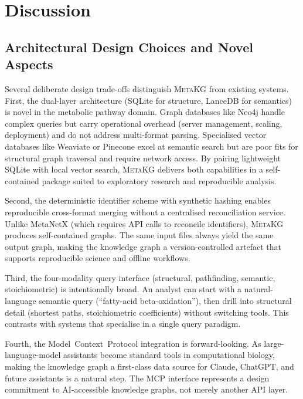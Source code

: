 \documentclass[10pt]{article}
\begin{document}
\section{Discussion}
\label{sec:discussion}

\subsection{Architectural Design Choices and Novel Aspects}

Several deliberate design trade-offs distinguish \textsc{MetaKG} from existing
systems. First, the dual-layer architecture (SQLite for structure, LanceDB for
semantics) is novel in the metabolic pathway domain. Graph databases like
Neo4j handle complex queries but carry operational overhead (server
management, scaling, deployment) and do not address multi-format parsing.
Specialised vector databases like Weaviate or Pinecone excel at semantic
search but are poor fits for structural graph traversal and require network
access. By pairing lightweight SQLite with local vector search,
\textsc{MetaKG} delivers both capabilities in a self-contained package suited
to exploratory research and reproducible analysis.

Second, the deterministic identifier scheme with synthetic hashing enables
reproducible cross-format merging without a centralised reconciliation
service. Unlike MetaNetX (which requires API calls to reconcile identifiers),
\textsc{MetaKG} produces self-contained graphs. The same input files always
yield the same output graph, making the knowledge graph a version-controlled
artefact that supports reproducible science and offline workflows.

Third, the four-modality query interface (structural, pathfinding, semantic,
stoichiometric) is intentionally broad. An analyst can start with a
natural-language semantic query (``fatty-acid beta-oxidation''), then drill
into structural detail (shortest paths, stoichiometric coefficients) without
switching tools. This contrasts with systems that specialise in a single query
paradigm.

Fourth, the Model~Context~Protocol integration is forward-looking. As
large-language-model assistants become standard tools in computational biology,
making the knowledge graph a first-class data source for Claude, ChatGPT, and
future assistants is a natural step. The MCP interface represents a design
commitment to AI-accessible knowledge graphs, not merely another API layer.
\end{document}
